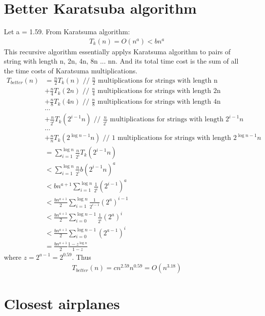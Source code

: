 \documentclass{article}
\begin{document}
\section{Better Karatsuba algorithm}
Let a = 1.59. From Karatsuma algorithm:
\begin{align*}
T_k(n) = O(n^a) < bn^a
\end{align*}
This recursive algorithm essentially applys Karatsuma algorithm to pairs
of string with length n, 2n, 4n, 8n ... nn. And its total time cost is the sum
of all the time costs of Karatsuma multiplications.
\begin{align*}
T_{better}(n)&= \frac{n}{2}T_k(n) \text{ // $\frac{n}{2}$ multiplications for
strings with length n} \\
&+ \frac{n}{4}T_k(2n) \text{ // $\frac{n}{4}$ multiplications for strings with
length 2n} \\
&+ \frac{n}{8}T_k(4n) \text{ // $\frac{n}{8}$ multiplications for strings with
length 4n} \\
& \ldots \\
&+ \frac{n}{2^{i}}T_k(2^{i-1}n) \text{ // $\frac{n}{2^{i}}$ multiplications
for strings with length $2^{i-1}n$} \\
& \ldots \\
&+ \frac{n}{n}T_k(2^{\log n -1}n) \text{ // $1$ multiplications for
strings with length $2^{\log n -1}n$} \\
&= \sum_{i = 1}^{\log n} \frac{n}{2^{i}} T_k(2^{i-1}n) \\
&< \sum_{i = 1}^{\log n} \frac{n}{2^{i}} b(2^{i-1}n)^a \\
&< bn^{a+1} \sum_{i = 1}^{\log n} \frac{1}{2^{i}} (2^{i-1})^a \\
&< \frac{bn^{a+1}}{2} \sum_{i = 1}^{\log n} \frac{1}{2^{i-1}} (2^a)^{i-1} \\
&< \frac{bn^{a+1}}{2} \sum_{i = 0}^{\log n - 1} \frac{1}{2^i} (2^a)^i \\
&< \frac{bn^{a+1}}{2} \sum_{i = 0}^{\log n - 1} (2^{a-1})^i \\
&= \frac{bn^{a+1}}{2} \frac{1- z^{\log n}}{1 - z}
\end{align*}
where $z = 2^{a-1} = 2^{0.59}$. Thus
\begin{align*}
T_{better}(n) = c n^{2.59} n^{0.59} = O(n^{3.18})
\end{align*}
\section{Closest airplanes}
\end{document}
